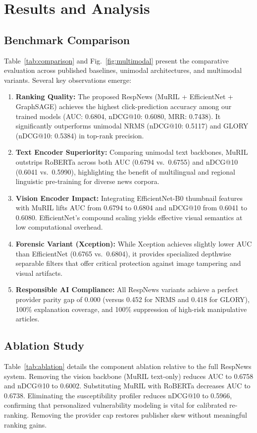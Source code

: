 \documentclass[conference]{IEEEtran}
\begin{document}
\section{Results and Analysis}
\subsection{Benchmark Comparison}
Table~\ref{tab:comparison} and Fig.~\ref{fig:multimodal} present the comparative evaluation across published baselines, unimodal architectures, and multimodal variants. Several key observations emerge:
\begin{enumerate}
    \item \textbf{Ranking Quality:} The proposed RespNews (MuRIL + EfficientNet + GraphSAGE) achieves the highest click-prediction accuracy among our trained models (AUC: 0.6804, nDCG@10: 0.6080, MRR: 0.7438). It significantly outperforms unimodal NRMS (nDCG@10: 0.5117) and GLORY (nDCG@10: 0.5384) in top-rank precision.
    \item \textbf{Text Encoder Superiority:} Comparing unimodal text backbones, MuRIL outstrips RoBERTa across both AUC (0.6794 vs.\ 0.6755) and nDCG@10 (0.6041 vs.\ 0.5990), highlighting the benefit of multilingual and regional linguistic pre-training for diverse news corpora.
    \item \textbf{Vision Encoder Impact:} Integrating EfficientNet-B0 thumbnail features with MuRIL lifts AUC from 0.6794 to 0.6804 and nDCG@10 from 0.6041 to 0.6080. EfficientNet's compound scaling yields effective visual semantics at low computational overhead.
    \item \textbf{Forensic Variant (Xception):} While Xception achieves slightly lower AUC than EfficientNet (0.6765 vs.\ 0.6804), it provides specialized depthwise separable filters that offer critical protection against image tampering and visual artifacts.
    \item \textbf{Responsible AI Compliance:} All RespNews variants achieve a perfect provider parity gap of 0.000 (versus 0.452 for NRMS and 0.418 for GLORY), 100\% explanation coverage, and 100\% suppression of high-risk manipulative articles.
\end{enumerate}

\subsection{Ablation Study}
Table~\ref{tab:ablation} details the component ablation relative to the full RespNews system. Removing the vision backbone (MuRIL text-only) reduces AUC to 0.6758 and nDCG@10 to 0.6002. Substituting MuRIL with RoBERTa decreases AUC to 0.6738. Eliminating the susceptibility profiler reduces nDCG@10 to 0.5966, confirming that personalized vulnerability modeling is vital for calibrated re-ranking. Removing the provider cap restores publisher skew without meaningful ranking gains.
\end{document}
